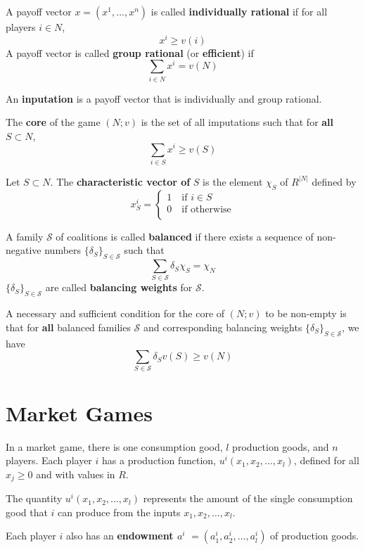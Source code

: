 \documentclass[11pt,a4paper]{article}
\begin{document}
A payoff vector $x = (x^1, \dots, x^n)$ is called \textbf{individually rational} if for all players $i \in N$,
\[
x^i \geqslant v(i)
\]
A payoff vector is called \textbf{group rational} (or \textbf{efficient}) if
\[
\sum_{i \in N} x^i = v(N)
\]

An \textbf{inputation} is a payoff vector that is individually and group rational.

The \textbf{core} of the game $(N; v)$ is the set of all imputations such that for \textbf{all} $S \subset N$,
\[
\sum_{i \in S} x^i \geqslant v(S)
\]

Let $S \subset N$. The \textbf{characteristic vector of} $S$ is the element $\chi_S$ of $R^{|N|}$ defined by
\[
x^i_S = 
\begin{cases}
    1 \quad \text{if } i \in S \\
    0 \quad \text{if otherwise} \\
\end{cases}
\]

A family $\mathcal{S}$ of coalitions is called \textbf{balanced} if there exists a sequence of non-negative numbers $\{\delta_S\}_{S \in \mathcal{S}}$ such that
\[
\sum_{S \in \mathcal{S}} \delta_S \chi_S = \chi_N
\]
$\{\delta_S\}_{S \in \mathcal{S}}$ are called \textbf{balancing weights} for $\mathcal{S}$. \par
{}

A necessary and sufficient condition for the core of $(N; v)$ to be non-empty is that for \textbf{all} balanced families $\mathcal{S}$ and corresponding balancing weights $\{\delta_S\}_{S \in \mathcal{S}}$, we have 
\[
\sum_{S \in \mathcal{S}} \delta_S v(S) \geqslant v(N)
\]

\section{Market Games}
In a market game, there is one consumption good, $l$ production goods, and $n$ players. Each player $i$ has a production function, $u^i(x_1, x_2, \dots, x_l)$, defined for all $x_j \geqslant 0$ and with values in $R$.  \par

The quantity $u^i(x_1, x_2, \dots, x_l)$ represents the amount of the single consumption good that $i$ can produce from the inputs $x_1, x_2, \dots, x_l$.

Each player $i$ also has an \textbf{endowment $a^i$} $ = (a_1^i, a_2^i, \dots, a_l^i)$ of production goods.
\end{document}
